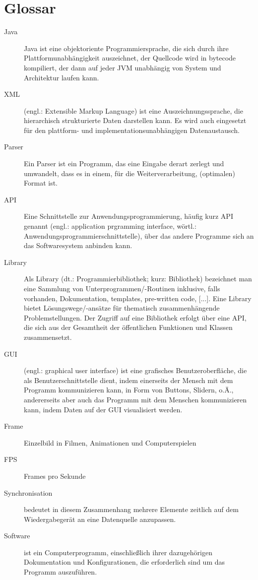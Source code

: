 \chapter{Glossar}
\begin{description}
\item [Java] Java ist eine objektoriente Programmiersprache, die sich durch ihre Plattformunabhängigkeit auszeichnet, der Quellcode wird in bytecode kompiliert, der dann auf jeder JVM unabhängig von System und Architektur laufen kann.
\item [XML] (engl.: \textsf{Extensible Markup Language}) ist eine Auszeichnungssprache, die hierarchisch strukturierte Daten darstellen kann. Es wird auch eingesetzt für den plattform- und implementationsunabhängigen Datenaustausch.
\item [Parser] Ein Parser ist ein Programm, das eine Eingabe derart zerlegt und umwandelt, dass es in einem, für die Weiterverarbeitung, (optimalen) Format ist.
\item [API] Eine Schnittstelle zur Anwendungsprogrammierung, häufig kurz API genannt (engl.: \textsf{application prgramming interface}, wörtl.: \textsf{Anwendungsprogrammierschnittstelle}), über das andere Programme sich an das Softwaresystem anbinden kann.
\item [Library] Als Library (dt.: \textsf{Programmierbibliothek}; kurz: \textsf{Bibliothek}) bezeichnet man eine Sammlung von Unterprogrammen/-Routinen inklusive, falls vorhanden, Dokumentation, templates, pre-written code, [...]. Eine Library bietet Lösungswege/-ansätze für thematisch zusammenhängende Problemstellungen. Der Zugriff auf eine Bibliothek erfolgt über eine API, die sich aus der Gesamtheit der öffentlichen Funktionen und Klassen zusammensetzt.
\item [GUI] (engl.: \textsf{graphical user interface}) ist eine grafisches Benutzeroberfläche, die als Benutzerschnittstelle dient, indem einerseits der Mensch mit dem Programm kommunizieren kann, in Form von Buttons, Slidern, o.Ä., andererseits aber auch das Programm mit dem Menschen kommunizieren kann, indem Daten auf der GUI visualisiert werden.
\item [Frame] Einzelbild in Filmen, Animationen und Computerspielen
\item [FPS] Frames pro Sekunde
\item [Synchronisation] bedeutet in diesem Zusammenhang mehrere Elemente zeitlich auf dem Wiedergabegerät an eine Datenquelle anzupassen.
\item [Software] ist ein Computerprogramm, einschließlich ihrer dazugehörigen Dokumentation und Konfigurationen, die erforderlich sind um das Programm auszuführen.

\end{description}
